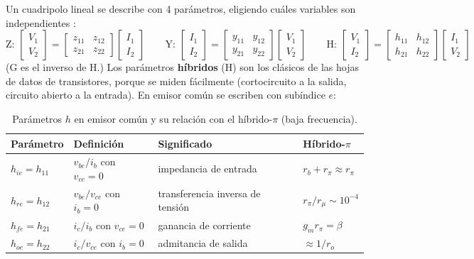 Un cuadripolo lineal se describe con 4 parámetros, eligiendo cuáles variables son
independientes :
\[
  \text{Z: }\begin{bmatrix}V_1\\V_2\end{bmatrix}=\begin{bmatrix}z_{11}&z_{12}\\z_{21}&z_{22}\end{bmatrix}\begin{bmatrix}I_1\\I_2\end{bmatrix}
  \qquad
  \text{Y: }\begin{bmatrix}I_1\\I_2\end{bmatrix}=\begin{bmatrix}y_{11}&y_{12}\\y_{21}&y_{22}\end{bmatrix}\begin{bmatrix}V_1\\V_2\end{bmatrix}
  \qquad
  \text{H: }\begin{bmatrix}V_1\\I_2\end{bmatrix}=\begin{bmatrix}h_{11}&h_{12}\\h_{21}&h_{22}\end{bmatrix}\begin{bmatrix}I_1\\V_2\end{bmatrix}
\]
(G es el inverso de H.) Los parámetros \textbf{híbridos} (H) son los clásicos de las hojas de
datos de transistores, porque se miden fácilmente (cortocircuito a la salida, circuito
abierto a la entrada). En emisor común se escriben con subíndice $e$:

\begin{table}[H]
\centering\small
\caption{Parámetros $h$ en emisor común y su relación con el híbrido-$\pi$ (baja frecuencia).}
\label{tab:hparam}
\begin{tabular}{llll}
\toprule
Parámetro & Definición & Significado & Híbrido-$\pi$ \\
\midrule
$h_{ie}=h_{11}$ & $v_{be}/i_b$ con $v_{ce}=0$ & impedancia de entrada & $r_b+r_\pi\approx r_\pi$ \\
$h_{re}=h_{12}$ & $v_{be}/v_{ce}$ con $i_b=0$ & transferencia inversa de tensión & $r_\pi/r_\mu\sim10^{-4}$ \\
$h_{fe}=h_{21}$ & $i_c/i_b$ con $v_{ce}=0$ & ganancia de corriente & $g_mr_\pi=\beta$ \\
$h_{oe}=h_{22}$ & $i_c/v_{ce}$ con $i_b=0$ & admitancia de salida & $\approx1/r_o$ \\
\bottomrule
\end{tabular}
\end{table}


